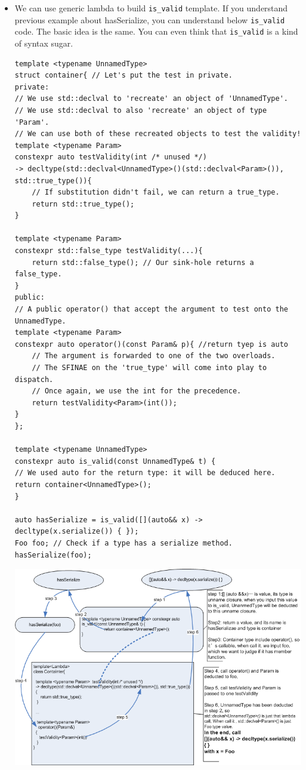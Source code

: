 \documentclass[a4paper,11pt,twoside]{book}
\begin{document}
\begin{itemize}
	\item We can use generic lambda to build \texttt{is\_valid} template. If you understand previous example about hasSerialize, you can understand below \texttt{is\_valid} code. The basic idea is the same. You can even think that \texttt{is\_valid} is a kind of syntax sugar. 

\begin{lstlisting}[numbers=none]
template <typename UnnamedType> 
struct container{ // Let's put the test in private.
private:
// We use std::declval to 'recreate' an object of 'UnnamedType'.
// We use std::declval to also 'recreate' an object of type 'Param'.
// We can use both of these recreated objects to test the validity!
template <typename Param> 
constexpr auto testValidity(int /* unused */)
-> decltype(std::declval<UnnamedType>()(std::declval<Param>()), std::true_type()){
	// If substitution didn't fail, we can return a true_type.
	return std::true_type();
}

template <typename Param> 
constexpr std::false_type testValidity(...){
	return std::false_type(); // Our sink-hole returns a false_type.
}
public:
// A public operator() that accept the argument to test onto the UnnamedType.
template <typename Param> 
constexpr auto operator()(const Param& p){ //return tyep is auto
	// The argument is forwarded to one of the two overloads.
	// The SFINAE on the 'true_type' will come into play to dispatch.
	// Once again, we use the int for the precedence.
	return testValidity<Param>(int());
}
};

template <typename UnnamedType> 
constexpr auto is_valid(const UnnamedType& t) {
// We used auto for the return type: it will be deduced here.
return container<UnnamedType>();
}

auto hasSerialize = is_valid([](auto&& x) -> decltype(x.serialize()) { });
Foo foo; // Check if a type has a serialize method.
hasSerialize(foo);
\end{lstlisting}

\begin{center}
\includegraphics[scale=0.59]{pics/is_valid.png}
\end{center}




\end{itemize}
\end{document}
